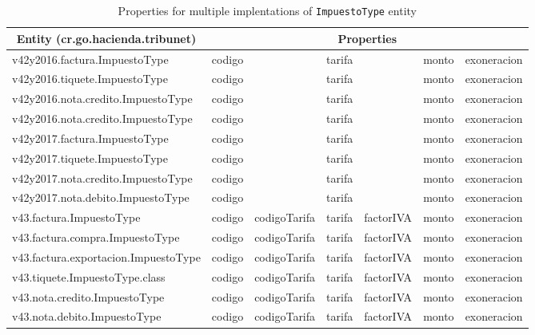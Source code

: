 \documentclass{article}
\begin{document}
\begin{table}[ht]
\centering
\begin{tabular}{@{}lllllll@{}}
\toprule
\multicolumn{1}{c}{Entity (cr.go.hacienda.tribunet)} & \multicolumn{6}{c}{Properties}                                   \\
\midrule
v42y2016.factura.ImpuestoType                        & codigo &              & tarifa &           & monto & exoneracion \\
v42y2016.tiquete.ImpuestoType                        & codigo &              & tarifa &           & monto & exoneracion \\
v42y2016.nota.credito.ImpuestoType                   & codigo &              & tarifa &           & monto & exoneracion \\
v42y2016.nota.credito.ImpuestoType                   & codigo &              & tarifa &           & monto & exoneracion \\
v42y2017.factura.ImpuestoType                        & codigo &              & tarifa &           & monto & exoneracion \\
v42y2017.tiquete.ImpuestoType                        & codigo &              & tarifa &           & monto & exoneracion \\
v42y2017.nota.credito.ImpuestoType                   & codigo &              & tarifa &           & monto & exoneracion \\
v42y2017.nota.debito.ImpuestoType                    & codigo &              & tarifa &           & monto & exoneracion \\
v43.factura.ImpuestoType                             & codigo & codigoTarifa & tarifa & factorIVA & monto & exoneracion \\
v43.factura.compra.ImpuestoType                      & codigo & codigoTarifa & tarifa & factorIVA & monto & exoneracion \\
v43.factura.exportacion.ImpuestoType                 & codigo & codigoTarifa & tarifa & factorIVA & monto & exoneracion \\
v43.tiquete.ImpuestoType.class                       & codigo & codigoTarifa & tarifa & factorIVA & monto & exoneracion \\
v43.nota.credito.ImpuestoType                        & codigo & codigoTarifa & tarifa & factorIVA & monto & exoneracion \\
v43.nota.debito.ImpuestoType                         & codigo & codigoTarifa & tarifa & factorIVA & monto & exoneracion \\
\bottomrule
\end{tabular}
\caption{Properties for multiple implentations of \texttt{ImpuestoType} entity}
\label{tbl:ImpuestoTypeProperties}
\end{table}
\end{document}
